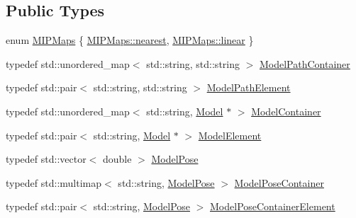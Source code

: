 \subsection*{Public Types}
\begin{DoxyCompactItemize}
\item 
enum \mbox{\hyperlink{classSICAD_a7e092dede6f660355462d6d548214198}{M\+I\+P\+Maps}} \{ \mbox{\hyperlink{classSICAD_a7e092dede6f660355462d6d548214198ad879c351426770bc0b13c3628db1e636}{M\+I\+P\+Maps\+::nearest}}, 
\mbox{\hyperlink{classSICAD_a7e092dede6f660355462d6d548214198a9a932b3cb396238423eb2f33ec17d6aa}{M\+I\+P\+Maps\+::linear}}
 \}
\item 
typedef std\+::unordered\+\_\+map$<$ std\+::string, std\+::string $>$ \mbox{\hyperlink{classSICAD_a9e1e1460d4c0f331b4fd015aae4dd721}{Model\+Path\+Container}}
\item 
typedef std\+::pair$<$ std\+::string, std\+::string $>$ \mbox{\hyperlink{classSICAD_a5148c8a96c82625706ce2e5b86b52dd7}{Model\+Path\+Element}}
\item 
typedef std\+::unordered\+\_\+map$<$ std\+::string, \mbox{\hyperlink{classModel}{Model}} $\ast$ $>$ \mbox{\hyperlink{classSICAD_aca3c9693d298f2e8dc171194c6a7507c}{Model\+Container}}
\item 
typedef std\+::pair$<$ std\+::string, \mbox{\hyperlink{classModel}{Model}} $\ast$ $>$ \mbox{\hyperlink{classSICAD_af999665097d7cdf11780735bf24a6956}{Model\+Element}}
\item 
typedef std\+::vector$<$ double $>$ \mbox{\hyperlink{classSuperimpose_a85d40a5caf19f486d1e0c15c0a025378}{Model\+Pose}}
\item 
typedef std\+::multimap$<$ std\+::string, \mbox{\hyperlink{classSuperimpose_a85d40a5caf19f486d1e0c15c0a025378}{Model\+Pose}} $>$ \mbox{\hyperlink{classSuperimpose_a178e3d4e2def6635bfcf9454dd4b5d22}{Model\+Pose\+Container}}
\item 
typedef std\+::pair$<$ std\+::string, \mbox{\hyperlink{classSuperimpose_a85d40a5caf19f486d1e0c15c0a025378}{Model\+Pose}} $>$ \mbox{\hyperlink{classSuperimpose_a1e02e0225687b42296dcfee4eadf8a55}{Model\+Pose\+Container\+Element}}
\end{DoxyCompactItemize}
